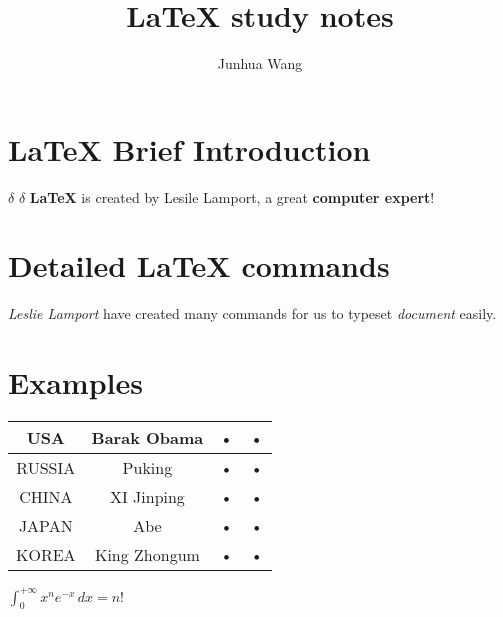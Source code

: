 \documentclass[12pt,a4paper]{article}
\author{Junhua Wang}
\title{LaTeX study notes}
\begin{document}
\section{LaTeX Brief Introduction}
$\delta$ $\delta$ \textbf{LaTeX} is created by Lesile Lamport, a great \textbf{computer expert}!
\section{Detailed LaTeX commands}
\textit{Leslie Lamport} have created many commands for us to typeset \emph{document} easily.
\section{Examples}
\begin{tabular}{|c|c|c|c|}
\hline 
USA & Barak Obama & • & • \\ 
\hline 
RUSSIA & Puking & • & • \\ 
\hline 
CHINA & XI Jinping & • & • \\ 
\hline 
JAPAN & Abe & • & • \\ 
\hline 
KOREA & King Zhongum & • & • \\ 
\hline 
\end{tabular} 

$\int_0^{+\infty}x^n e^{-x}\,dx = n!$
\end{document}
